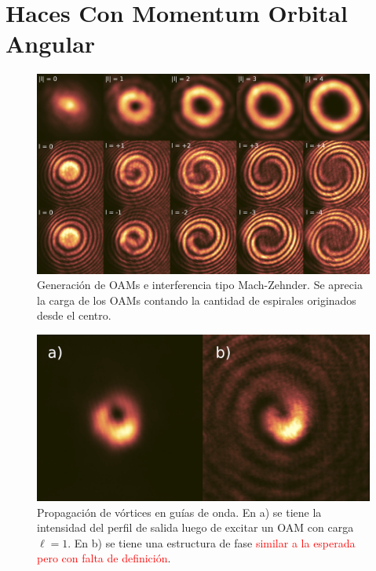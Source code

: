\chapter{Haces Con Momentum Orbital Angular}

\begin{figure}[H]
	\centering
	\includegraphics[width=0.8\linewidth]{media/OAM-free.png}
	\caption[Generación de OAMs e interferencia tipo Mach-Zehnder.]{Generación de OAMs e interferencia tipo Mach-Zehnder. Se aprecia la carga de los OAMs contando la cantidad de espirales originados desde el centro.}
\end{figure}

\begin{figure}[H]
	\centering
	\includegraphics[width=0.8\linewidth]{media/vortex.png}
	\caption[Propagación de vórtices en guías de onda.]{Propagación de vórtices en guías de onda. En a) se tiene la intensidad del perfil de salida luego de excitar un OAM con carga $\ell=1$. En b) se tiene una estructura de fase \textcolor{red}{similar a la esperada pero con falta de definición}.}
\end{figure}